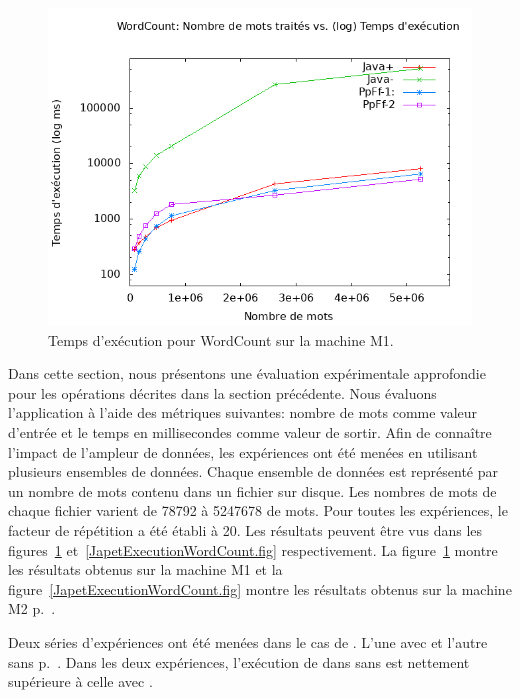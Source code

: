 \begin{figure}[H]
\centering
     \includegraphics[width=1.0\textwidth]{Figures/GrapheTempsWordCount.png}
      \caption{Temps d'ex\'ecution pour WordCount sur la machine M1.}
       \label{GrapheTempsWordCount.fig}
\end{figure}


Dans cette section, nous présentons une \'evaluation exp\'erimentale approfondie pour les op\'erations d\'ecrites dans la section pr\'ec\'edente. Nous \'evaluons l'application  \`a l'aide des m\'etriques suivantes: nombre de mots comme valeur d'entr\'ee et le temps en millisecondes comme valeur de sortir. Afin de conna\^itre l'impact de l'ampleur de donn\'ees, les exp\'eriences ont \'et\'e men\'ees en utilisant plusieurs ensembles de donn\'ees. Chaque ensemble de donn\'ees est repr\'esent\'e par un nombre de mots contenu dans un fichier sur disque. Les nombres de mots de chaque fichier varient de 78792 \`a 5247678 de mots. Pour toutes les exp\'eriences, le facteur de r\'ep\'etition a \'et\'e \'etabli \`a 20.  Les r\'esultats peuvent \^etre vus dans les figures~\ref{GrapheTempsWordCount.fig} et~\ref{JapetExecutionWordCount.fig} respectivement. La figure~\ref{GrapheTempsWordCount.fig} montre les résultats obtenus sur la machine M1 et la figure~\ref{JapetExecutionWordCount.fig} montre les r\'esultats obtenus sur la machine M2 p.~\pageref{machines.sect}.

Deux s\'eries d'exp\'eriences ont \'et\'e men\'ees dans le cas de . L'une avec et l'autre sans  p.~\pageref{jitDescription.sect}. Dans les deux exp\'eriences, l'ex\'ecution de  dans  sans  est nettement sup\'erieure \`a celle avec .

